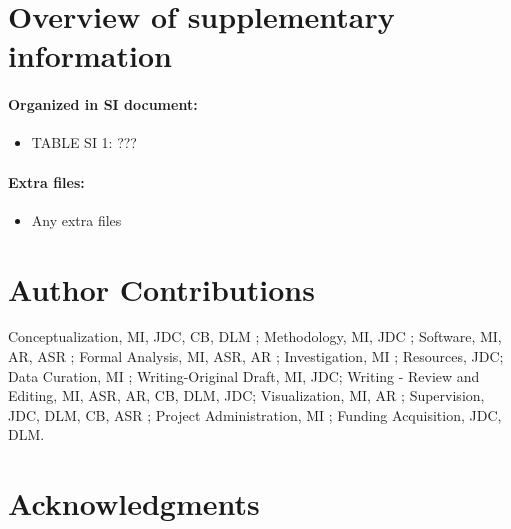 \documentclass[9pt,lineno]{elife}
\begin{document}
\section{Overview of supplementary information}

\paragraph{Organized in SI document:}

\begin{itemize}
\item TABLE SI 1: ???

\end{itemize}

\paragraph{Extra files:}  
\begin{itemize}
\item Any extra files
\end{itemize}


\section{Author Contributions}

Conceptualization, MI, JDC, CB, DLM ; Methodology, MI, JDC ; Software, MI, AR, ASR ; Formal Analysis, MI, ASR, AR ; Investigation, MI ; Resources, JDC;  Data Curation, MI ; Writing-Original Draft, MI, JDC; Writing - Review and Editing, MI, ASR, AR, CB, DLM, JDC; Visualization, MI, AR ; Supervision, JDC, DLM, CB, ASR ; Project Administration, MI ; Funding Acquisition, JDC, DLM.


\section{Acknowledgments}
\end{document}
